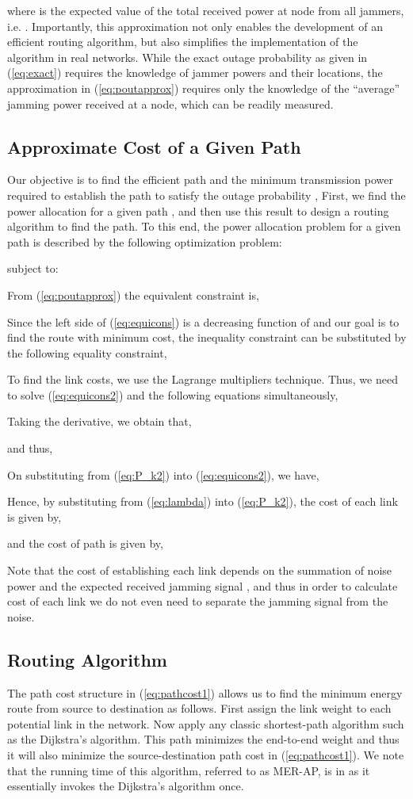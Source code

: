 \documentclass[10pt,journal]{IEEEtran}
\theoremstyle{definition}
\begin{document}
where  is the expected value of the total received power at node  from all jammers, i.e. .
Importantly, this approximation not only  enables the development of an efficient routing algorithm, but  also  simplifies the implementation of the algorithm in real networks. While the exact outage probability as given in (\ref{eq:exact}) requires the knowledge of jammer powers and their locations, the approximation in (\ref{eq:poutapprox}) requires only the knowledge of the ``average'' jamming power received at a node, which can be readily measured.
\subsection{Approximate Cost of a Given Path}\label{sec:optimalcost}

 Our objective is to find the efficient  path  and the minimum transmission power required to
establish the path to satisfy the outage probability ,
First, we find the  power allocation for a given path , and then use this result to design a routing algorithm to find the  path. 
To this end, the  power allocation problem for a given path  is described by the following optimization problem: 

subject to:

From (\ref{eq:poutapprox}) the equivalent constraint is,

Since the left side of (\ref{eq:equicons}) is a decreasing function of  and our goal is to find the route with minimum cost, the inequality constraint can be substituted by the following equality constraint,
 
To find the  link costs, we use the Lagrange multipliers technique.
Thus, we need to solve (\ref{eq:equicons2}) and the following  equations simultaneously,

Taking the derivative, we obtain that,

and thus,

On substituting  from (\ref{eq:P_k2}) into (\ref{eq:equicons2}), we have,

Hence, by substituting  from (\ref{eq:lambda}) into (\ref{eq:P_k2}), the  cost of each link is given by,

and the  cost of path  is given by,

Note that the cost of establishing each link depends on the summation of noise power and the expected received jamming signal , and thus in order to calculate cost of each link we do not even need to separate the jamming signal from the noise.
\subsection{Routing Algorithm}
The  path cost structure in (\ref{eq:pathcost1}) allows us to find the minimum energy route from source to destination as follows. First assign the link weight  to each potential link  in the network. Now apply any classic shortest-path algorithm such as the Dijkstra's algorithm.  
This path minimizes the end-to-end weight  and thus it will also minimize the source-destination path cost  in (\ref{eq:pathcost1}). 
We note that the running time of this algorithm, referred to as MER-AP, is in  as it essentially invokes the Dijkstra's algorithm once.
\end{document}
